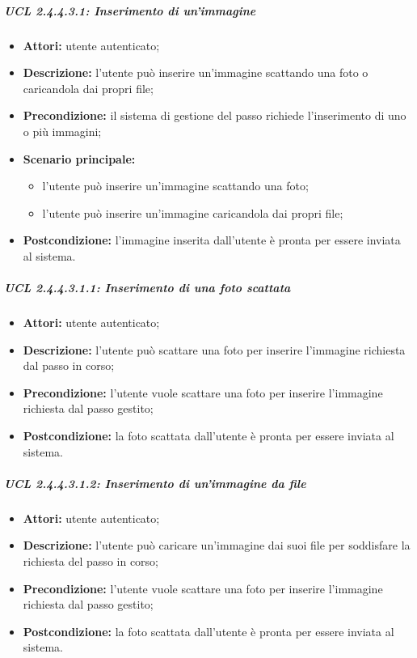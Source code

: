 \subparagraph{UCL 2.4.4.3.1: Inserimento di un'immagine}
\begin{itemize}
\item \textbf{Attori:} utente autenticato;
\item \textbf{Descrizione:} l'utente può inserire un'immagine scattando una foto o caricandola dai propri file;
\item \textbf{Precondizione:} il sistema di gestione del passo richiede l'inserimento di uno o più immagini;
\item \textbf{Scenario principale:}
\begin{itemize}
\item l'utente può inserire un'immagine scattando una foto;
\item l'utente può inserire un'immagine caricandola dai propri file;
\end{itemize}
\item \textbf{Postcondizione:} l'immagine inserita dall'utente è pronta per essere inviata al sistema.
\end{itemize}

\subparagraph{UCL 2.4.4.3.1.1: Inserimento di una foto scattata}
\begin{itemize}
\item \textbf{Attori:} utente autenticato;
\item \textbf{Descrizione:} l'utente può scattare una foto per inserire l'immagine richiesta dal passo in corso;
\item \textbf{Precondizione:} l'utente vuole scattare una foto per inserire l'immagine richiesta dal passo gestito;
\item \textbf{Postcondizione:} la foto scattata dall'utente è pronta per essere inviata al sistema.
\end{itemize}

\subparagraph{UCL 2.4.4.3.1.2: Inserimento di un'immagine da file}
\begin{itemize}
\item \textbf{Attori:} utente autenticato;
\item \textbf{Descrizione:} l'utente può caricare un'immagine dai suoi file per soddisfare la richiesta del passo in corso;
\item \textbf{Precondizione:} l'utente vuole scattare una foto per inserire l'immagine richiesta dal passo gestito;
\item \textbf{Postcondizione:} la foto scattata dall'utente è pronta per essere inviata al sistema.
\end{itemize}

